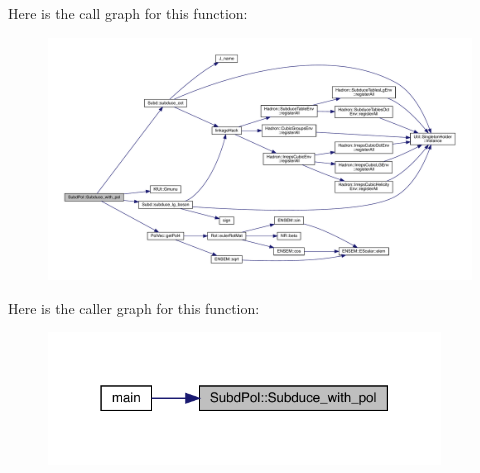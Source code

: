 Here is the call graph for this function\+:
\nopagebreak
\begin{figure}[H]
\begin{center}
\leavevmode
\includegraphics[width=350pt]{db/d8a/namespaceSubdPol_ad6ba4f4261604a40b788b2922ed2871e_cgraph}
\end{center}
\end{figure}
Here is the caller graph for this function\+:\nopagebreak
\begin{figure}[H]
\begin{center}
\leavevmode
\includegraphics[width=295pt]{db/d8a/namespaceSubdPol_ad6ba4f4261604a40b788b2922ed2871e_icgraph}
\end{center}
\end{figure}
